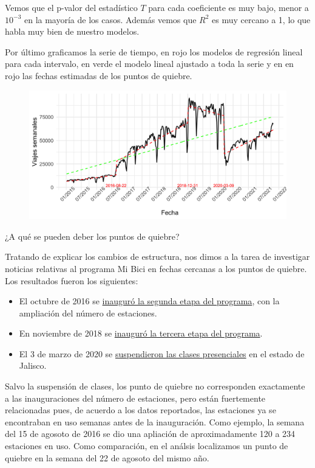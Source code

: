 \documentclass[
]{article}
\begin{document}
Vemos que el p-valor del estadístico \(T\) para cada coeficiente es muy
bajo, menor a \(10^{-3}\) en la mayoría de los casos. Además vemos que
\(R^2\) es muy cercano a 1, lo que habla muy bien de nuestro modelos.

Por último graficamos la serie de tiempo, en rojo los modelos de
regresión lineal para cada intervalo, en verde el modelo lineal ajustado
a toda la serie y en en rojo las fechas estimadas de los puntos de
quiebre.

\begin{figure}
\centering
\includegraphics[width=12cm]{../plots/serie_breaks.png}
\end{figure}

¿A qué se pueden deber los puntos de quiebre?

Tratando de explicar los cambios de estructura, nos dimos a la tarea de
investigar noticias relativas al programa Mi Bici en fechas cercanas a
los puntos de quiebre. Los resultados fueron los siguientes:

\begin{itemize}
\item
  El octubre de 2016 se
  \href{https://www.informador.mx/Jalisco/Inauguran-segunda-etapa-de-MiBici-20161027-0035.html}{inauguró
  la segunda etapa del programa}, con la ampliación del número de
  estaciones.
\item
  En noviembre de 2018 se
  \href{https://www.eloccidental.com.mx/local/inauguran-tercera-etapa-de-mibici-2714371.html}{inauguró
  la tercera etapa del programa}.
\item
  El 3 de marzo de 2020 se
  \href{https://www.animalpolitico.com/2020/03/jalisco-suspende-clases-universidades-eventos-masivos-coronavirus/}{suspendieron
  las clases presenciales} en el estado de Jalisco.
\end{itemize}

Salvo la suspensión de clases, los punto de quiebre no corresponden
exactamente a las inauguraciones del número de estaciones, pero están
fuertemente relacionadas pues, de acuerdo a los datos reportados, las
estaciones ya se encontraban en uso semanas antes de la inauguración.
Como ejemplo, la semana del 15 de agosoto de 2016 se dio una apliación
de aproximadamente 120 a 234 estaciones en uso. Como comparación, en el
análsis localizamos un punto de quiebre en la semana del 22 de agosoto
del mismo año.
\end{document}

